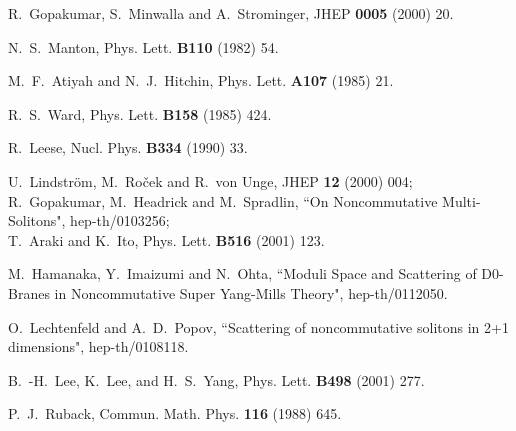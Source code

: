 \documentclass[a4paper,12pt]{article}
\begin{document}
\begin{thebibliography}{99}
R.~Gopakumar, S.~Minwalla and A.~Strominger, JHEP {\bf 0005} (2000) 20.

N.~S.~Manton,
Phys. Lett. {\bf B110} (1982) 54.

M.~F.~Atiyah and N.~J.~Hitchin,
Phys. Lett. {\bf A107} (1985) 21.

R.~S.~Ward, Phys. Lett. {\bf B158} (1985) 424.

R.~Leese, Nucl. Phys. {\bf B334} (1990) 33.

U.~Lindstr\"om, M.~Ro\v{c}ek and R.~von Unge, JHEP {\bf 12} (2000) 004; \\
R.~Gopakumar, M.~Headrick and M.~Spradlin, ``On Noncommutative Multi-Solitons", 
hep-th/0103256; \\
T.~Araki and K.~Ito, Phys. Lett. {\bf B516} (2001) 123. 

M.~Hamanaka, Y.~Imaizumi and N.~Ohta, 
``Moduli Space and Scattering of D0-Branes in Noncommutative Super Yang-Mills Theory", 
hep-th/0112050. 

O.~Lechtenfeld and A.~D.~Popov,
``Scattering of noncommutative solitons in 2+1 dimensions",
hep-th/0108118.

B.~-H.~Lee, K.~Lee, and H.~S.~Yang, Phys. Lett. {\bf B498} (2001) 277.

P.~J.~Ruback, Commun. Math. Phys. {\bf 116} (1988) 645.

\end{thebibliography}
\end{document}
